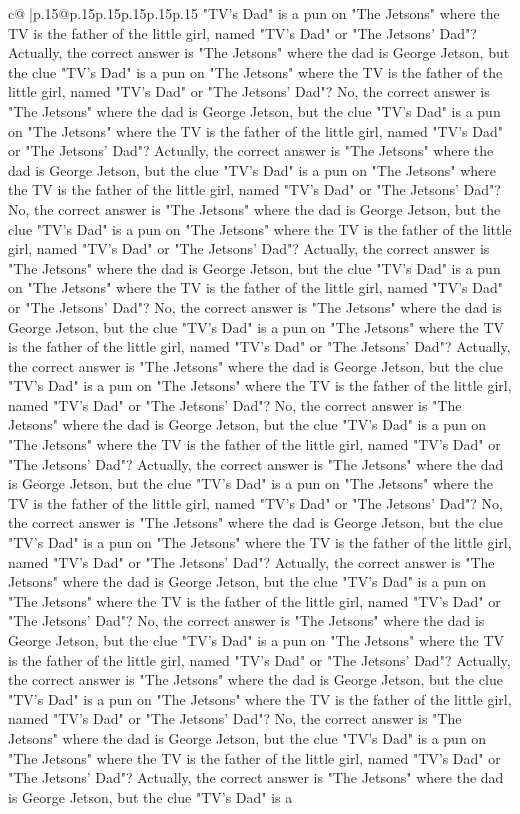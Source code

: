 \documentclass{article}
\begin{document}
{\begin{supertabular}{c@{$\;$}|p{.15\linewidth}@{}p{.15\linewidth}p{.15\linewidth}p{.15\linewidth}p{.15\linewidth}p{.15\linewidth}}
{{{"TV's Dad" is a pun on "The Jetsons" where the TV is the father of the little girl, named "TV's Dad" or "The Jetsons' Dad"? Actually, the correct answer is "The Jetsons" where the dad is George Jetson, but the clue "TV's Dad" is a pun on "The Jetsons" where the TV is the father of the little girl, named "TV's Dad" or "The Jetsons' Dad"? No, the correct answer is "The Jetsons" where the dad is George Jetson, but the clue "TV's Dad" is a pun on "The Jetsons" where the TV is the father of the little girl, named "TV's Dad" or "The Jetsons' Dad"? Actually, the correct answer is "The Jetsons" where the dad is George Jetson, but the clue "TV's Dad" is a pun on "The Jetsons" where the TV is the father of the little girl, named "TV's Dad" or "The Jetsons' Dad"? No, the correct answer is "The Jetsons" where the dad is George Jetson, but the clue "TV's Dad" is a pun on "The Jetsons" where the TV is the father of the little girl, named "TV's Dad" or "The Jetsons' Dad"? Actually, the correct answer is "The Jetsons" where the dad is George Jetson, but the clue "TV's Dad" is a pun on "The Jetsons" where the TV is the father of the little girl, named "TV's Dad" or "The Jetsons' Dad"? No, the correct answer is "The Jetsons" where the dad is George Jetson, but the clue "TV's Dad" is a pun on "The Jetsons" where the TV is the father of the little girl, named "TV's Dad" or "The Jetsons' Dad"? Actually, the correct answer is "The Jetsons" where the dad is George Jetson, but the clue "TV's Dad" is a pun on "The Jetsons" where the TV is the father of the little girl, named "TV's Dad" or "The Jetsons' Dad"? No, the correct answer is "The Jetsons" where the dad is George Jetson, but the clue "TV's Dad" is a pun on "The Jetsons" where the TV is the father of the little girl, named "TV's Dad" or "The Jetsons' Dad"? Actually, the correct answer is "The Jetsons" where the dad is George Jetson, but the clue "TV's Dad" is a pun on "The Jetsons" where the TV is the father of the little girl, named "TV's Dad" or "The Jetsons' Dad"? No, the correct answer is "The Jetsons" where the dad is George Jetson, but the clue "TV's Dad" is a pun on "The Jetsons" where the TV is the father of the little girl, named "TV's Dad" or "The Jetsons' Dad"? Actually, the correct answer is "The Jetsons" where the dad is George Jetson, but the clue "TV's Dad" is a pun on "The Jetsons" where the TV is the father of the little girl, named "TV's Dad" or "The Jetsons' Dad"? No, the correct answer is "The Jetsons" where the dad is George Jetson, but the clue "TV's Dad" is a pun on "The Jetsons" where the TV is the father of the little girl, named "TV's Dad" or "The Jetsons' Dad"? Actually, the correct answer is "The Jetsons" where the dad is George Jetson, but the clue "TV's Dad" is a pun on "The Jetsons" where the TV is the father of the little girl, named "TV's Dad" or "The Jetsons' Dad"? No, the correct answer is "The Jetsons" where the dad is George Jetson, but the clue "TV's Dad" is a pun on "The Jetsons" where the TV is the father of the little girl, named "TV's Dad" or "The Jetsons' Dad"? Actually, the correct answer is "The Jetsons" where the dad is George Jetson, but the clue "TV's Dad" is a }}}
\end{supertabular}}
\end{document}
